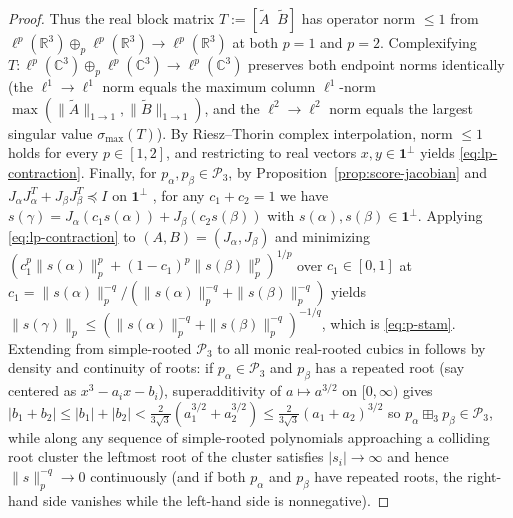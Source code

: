 \documentclass[11pt,a4paper]{article}
\theoremstyle{definition}
\newcommand{\R}{\mathbb{R}}
\newcommand{\one}{\mathbf{1}}
\begin{document}
\begin{proof}
Thus the real block matrix $T := [\tilde{A}\;\;\tilde{B}]$ has operator norm $\le 1$ from $\ell^p(\R^3) \oplus_p \ell^p(\R^3) \to \ell^p(\R^3)$ at both $p = 1$ and $p = 2$. Complexifying $T : \ell^p(\mathbb{C}^3) \oplus_p \ell^p(\mathbb{C}^3) \to \ell^p(\mathbb{C}^3)$ preserves both endpoint norms identically (the $\ell^1 \to \ell^1$ norm equals the maximum column $\ell^1$-norm $\max(\|\tilde{A}\|_{1\to 1}, \|\tilde{B}\|_{1\to 1})$, and the $\ell^2 \to \ell^2$ norm equals the largest singular value $\sigma_{\max}(T)$). By Riesz--Thorin complex interpolation, norm $\le 1$ holds for every $p \in [1, 2]$, and restricting to real vectors $x, y \in \one^\perp$ yields \eqref{eq:lp-contraction}. Finally, for $p_\alpha, p_\beta \in \mathcal{P}_3$, by Proposition~\ref{prop:score-jacobian} and $J_\alpha J_\alpha^T + J_\beta J_\beta^T \preceq I$ on $\one^\perp$ \cite[Proposition~5.3]{GSS2026}, for any $c_1 + c_2 = 1$ we have $s(\gamma) = J_\alpha(c_1 s(\alpha)) + J_\beta(c_2 s(\beta))$ with $s(\alpha), s(\beta) \in \one^\perp$. Applying \eqref{eq:lp-contraction} to $(A,B) = (J_\alpha, J_\beta)$ and minimizing $(c_1^p \|s(\alpha)\|_p^p + (1-c_1)^p \|s(\beta)\|_p^p)^{1/p}$ over $c_1 \in [0, 1]$ at $c_1 = \|s(\alpha)\|_p^{-q}/(\|s(\alpha)\|_p^{-q} + \|s(\beta)\|_p^{-q})$ yields $\|s(\gamma)\|_p \le (\|s(\alpha)\|_p^{-q} + \|s(\beta)\|_p^{-q})^{-1/q}$, which is \eqref{eq:p-stam}. Extending from simple-rooted $\mathcal{P}_3$ to all monic real-rooted cubics in \cite[Conjecture~5.2]{Hashemi2026} follows by density and continuity of roots: if $p_\alpha \in \mathcal{P}_3$ and $p_\beta$ has a repeated root (say centered as $x^3 - a_i x - b_i$), superadditivity of $a \mapsto a^{3/2}$ on $[0, \infty)$ gives $|b_1 + b_2| \le |b_1| + |b_2| < \frac{2}{3\sqrt{3}}(a_1^{3/2} + a_2^{3/2}) \le \frac{2}{3\sqrt{3}}(a_1 + a_2)^{3/2}$ so $p_\alpha \boxplus_3 p_\beta \in \mathcal{P}_3$, while along any sequence of simple-rooted polynomials approaching a colliding root cluster the leftmost root of the cluster satisfies $|s_i| \to \infty$ and hence $\|s\|_p^{-q} \to 0$ continuously (and if both $p_\alpha$ and $p_\beta$ have repeated roots, the right-hand side vanishes while the left-hand side is nonnegative).
\end{proof}
\end{document}
